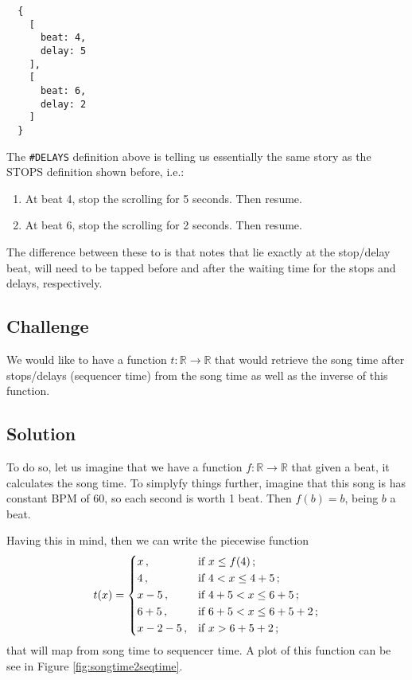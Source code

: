 \documentclass[a4paper,9pt]{article}
\begin{document}
    \begin{verbatim}
  {
    [
      beat: 4,
      delay: 5 
    ],
    [
      beat: 6,
      delay: 2 
    ]
  }
    \end{verbatim}
    The \texttt{\#DELAYS} definition above is telling us essentially the same story as the STOPS definition shown before, i.e.: 
    \begin{enumerate}
	    \item At beat 4, stop the scrolling for 5 seconds. Then resume.
	    \item At beat 6, stop the scrolling for 2 seconds. Then resume.
    \end{enumerate}

    The difference between these to is that notes that lie exactly at the stop/delay beat, will need to be tapped before and after the waiting time for the stops and delays, respectively.
    \subsection{Challenge}

    We would like to have a function $ t: \mathbb{R} \rightarrow \mathbb{R} $ that would retrieve the song time after stops/delays (sequencer time) from the song time as well as the inverse of this function.


    \subsection{Solution}

    To do so, let us imagine that we have a function $ f : \mathbb{R}\rightarrow \mathbb{R}$ that given a beat, it calculates the song time. To simplyfy things further, imagine that this song is has constant BPM of 60, so each second is worth 1 beat. Then $ f(b) = b $, being $ b $ a beat.

    Having this in mind, then we can write the piecewise function
    \begin{equation}
	    t(x) = \begin{dcases}
		    x\,, & \text{if $ x \leq f(4) $}\,; \\
		    4\,, & \text{if $4 <  x \leq 4+5 $}\,; \\
		    x-5\,, & \text{if $4 + 5 <  x \leq 6 + 5 $}\,; \\
		    6+5\,, & \text{if $6 + 5 <  x \leq 6 + 5+ 2 $}\,; \\
		    x-2-5\,, & \text{if $ x > 6+5+2 $}\,; \\
	    \end{dcases}
	    \label{l}
    \end{equation}
    that will map from song time to sequencer time. A plot of this function can be see in Figure \ref{fig:songtime2seqtime}. 
\end{document}
